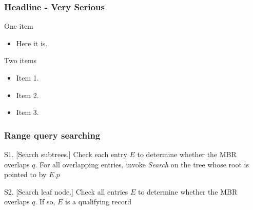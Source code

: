 \begin{frame}[t]
	\frametitle{Headline - Very Serious}
	One item
	\begin{itemize}
		\item Here it is.
	\end{itemize}
	\pause
	\vspace{0.5cm}
	Two items
	\begin{itemize}
		\item Item 1. \pause
		\item Item 2.
		\item Item 3.
	\end{itemize}
\end{frame}

\begin{frame}[t]
	\frametitle{Range query searching}
	\begin{block}{S1. [Search subtrees.]}
		 Check each entry $E$ to determine whether the MBR overlaps $q$.
		 For all overlapping entries, invoke \emph{Search} on the tree whose
		 root is pointed to by $E.p$
	\end{block}

	\begin{block}{S2. [Search leaf node.]}
		Check all entries $E$ to determine whether the MBR overlaps $q$.
		If so, $E$ is a qualifying record
	\end{block}
\end{frame}
